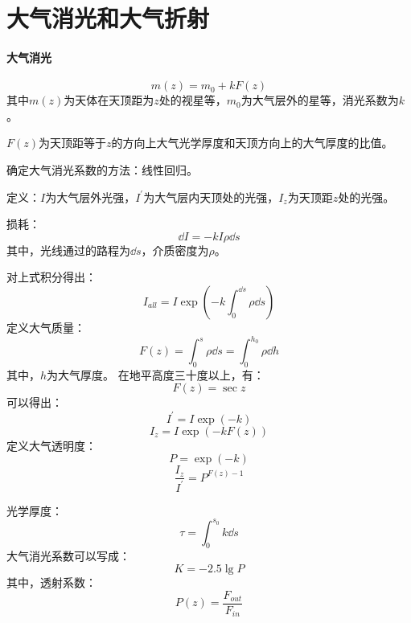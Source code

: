 \section{大气消光和大气折射}
\paragraph{大气消光}
\begin{equation}
	m(z)=m_{0}+kF(z)
\end{equation}
其中$m(z)$为天体在天顶距为$z$处的视星等，$m_{0}$为大气层外的星等，消光系数为$k$。

$F(z)$为天顶距等于$z$的方向上大气光学厚度和天顶方向上的大气厚度的比值。

确定大气消光系数的方法：线性回归。

定义：$I$为大气层外光强，$I^\prime$为大气层内天顶处的光强，$I_{z}$为天顶距$z$处的光强。

损耗：\begin{equation}
	\dd I=-kI\rho\dd s
\end{equation}
其中，光线通过的路程为$\dd s$，介质密度为$\rho$。

\noindent 对上式积分得出：
\begin{equation}
	I_{all}=I \exp(-k\int_{0}^{\dd s}\rho \dd s)
\end{equation}
定义大气质量：
\begin{equation}
	F(z)=\int_{0}^{s}\rho \dd s=\int_{0}^{h_{0}}\rho \dd h
\end{equation}
其中，$h$为大气厚度。
在地平高度三十度以上，有：
\begin{equation}
	F(z)=\sec z
\end{equation}
可以得出：
\begin{equation}
	I^\prime=I \exp(-k)
\end{equation}
\begin{equation}
	I_{z}=I\exp(-kF(z))
\end{equation}
定义大气透明度：
\begin{equation}
	P=\exp(-k)
\end{equation}
\begin{equation}
	\frac{I_{z}}{I^\prime}=P^{F(z)-1}
\end{equation}

光学厚度：
\begin{equation}
	\tau =\int_{0}^{s_{0}}k\dd s
\end{equation}
大气消光系数可以写成：
\begin{equation}
	K=-2.5\lg P
\end{equation}
其中，透射系数：
\begin{equation}
	P(z)=\frac{F_{out}}{F_{in}}
\end{equation}
